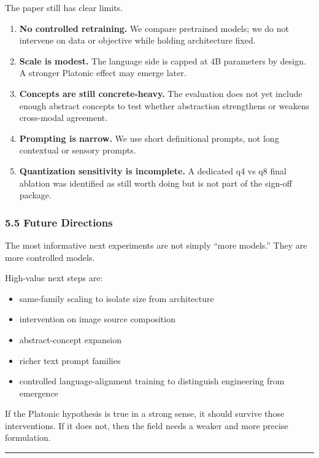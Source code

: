 \documentclass[
]{article}
\providecommand{\tightlist}{%
  \setlength{\itemsep}{0pt}\setlength{\parskip}{0pt}}
\begin{document}
The paper still has clear limits.

\begin{enumerate}
\def\labelenumi{\arabic{enumi}.}
\tightlist
\item
  \textbf{No controlled retraining.} We compare pretrained models; we do
  not intervene on data or objective while holding architecture fixed.
\item
  \textbf{Scale is modest.} The language side is capped at 4B parameters
  by design. A stronger Platonic effect may emerge later.
\item
  \textbf{Concepts are still concrete-heavy.} The evaluation does not
  yet include enough abstract concepts to test whether abstraction
  strengthens or weakens cross-modal agreement.
\item
  \textbf{Prompting is narrow.} We use short definitional prompts, not
  long contextual or sensory prompts.
\item
  \textbf{Quantization sensitivity is incomplete.} A dedicated q4 vs q8
  final ablation was identified as still worth doing but is not part of
  the sign-off package.
\end{enumerate}

\subsubsection{5.5 Future Directions}\label{future-directions}

The most informative next experiments are not simply ``more models.''
They are more controlled models.

High-value next steps are:

\begin{itemize}
\tightlist
\item
  same-family scaling to isolate size from architecture
\item
  intervention on image source composition
\item
  abstract-concept expansion
\item
  richer text prompt families
\item
  controlled language-alignment training to distinguish engineering from
  emergence
\end{itemize}

If the Platonic hypothesis is true in a strong sense, it should survive
those interventions. If it does not, then the field needs a weaker and
more precise formulation.

\begin{center}\rule{0.5\linewidth}{0.5pt}\end{center}
\end{document}
